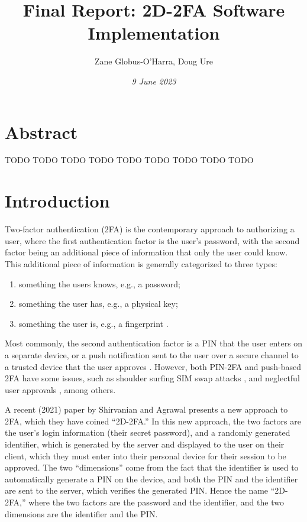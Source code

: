 \documentclass[11pt]{article} %
\title{Final Report: 2D-2FA Software Implementation}
\author{Zane Globus-O'Harra, Doug Ure}
\date{\textit{9 June 2023}}
\begin{document}
\maketitle

\section*{Abstract}

TODO TODO TODO TODO TODO TODO TODO TODO TODO 

\tableofcontents

\section{Introduction}

Two-factor authentication (2FA) is the contemporary approach to
authorizing a user, where the first authentication factor is the user's
password, with the second factor being an additional piece of
information that only the user could know. This additional piece of
information is generally categorized to three types:
\begin{enumerate}
    \item something the users knows, e.g., a password;
    \item something the user has, e.g., a physical key;
    \item something the user is, e.g., a fingerprint \cite{MFAProtocols}.
\end{enumerate}
Most commonly, the second authentication factor is a PIN that the user
enters on a separate device, or a push notification sent to the user
over a secure channel to a trusted device that the user approves
\cite{MFAProtocols}. However, both PIN-2FA and push-based 2FA have some
issues, such as shoulder surfing \cite{ShoulderSurfingWild,
ShoulderSurfingExperimental} SIM swap attacks \cite{Saha2016}, and
neglectful user approvals \cite{BypassingPush}, among others.

A recent (2021) paper \cite{shirvanian2d2fa} by Shirvanian and Agrawal
presents a new approach to 2FA, which they have coined ``2D-2FA.'' In
this new approach, the two factors are the user's login information
(their secret password), and a randomly generated identifier, which is
generated by the server and displayed to the user on their client, which
they must enter into their personal device for their session to be
approved. The two ``dimensions'' come from the fact that the identifier
is used to automatically generate a PIN on the device, and both the PIN
and the identifier are sent to the server, which verifies the generated
PIN. Hence the name ``2D-2FA,'' where the two factors are the password
and the identifier, and the two dimensions are the identifier and the
PIN. 
\end{document}
